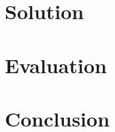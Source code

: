 \documentclass[letterpaper,12pt,titlepage,oneside,final]{book}
\let\origdoublepage\cleardoublepage
\newcommand{\clearemptydoublepage}{%
  \clearpage{\pagestyle{empty}\origdoublepage}}
\let\cleardoublepage\clearemptydoublepage
\begin{document}
\chapter{Solution}



\chapter{Evaluation}



\chapter{Conclusion}






\cleardoublepage %
\renewcommand*{\bibname}{References}


%


\end{document}
